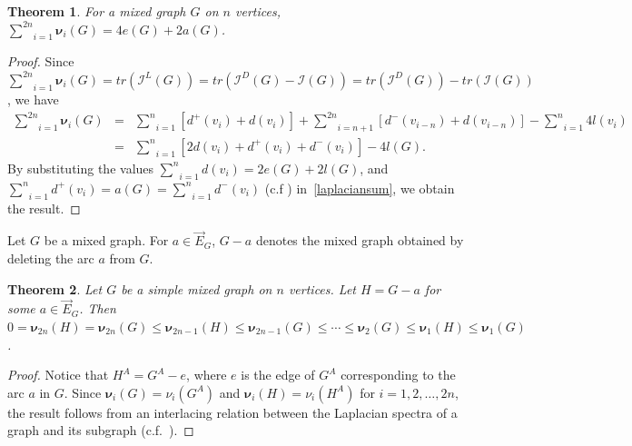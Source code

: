 \documentclass[12pt]{article}
\numberwithin{equation}{section}
\newtheorem{thm}{Theorem}[section]
\begin{document}
	\begin{thm}\label{thm-laplacian-evsum}
		For a mixed graph $G$ on $n$ vertices, $\underset{i=1}{\overset{2n}{\sum}}\bm{\nu}_i(G)=4e(G)+2a(G)$.
	\end{thm}
	\begin{proof}
		Since $\underset{i=1}{\overset{2n}{\sum}}\bm{\nu}_i(G)=tr(\mathcal{I}^L(G))=tr(\mathcal{I}^D(G)-\mathcal{I}(G))=tr(\mathcal{I}^D(G))-tr(\mathcal{I}(G))$, we have
		\begin{eqnarray}\label{laplaciansum}
			\underset{i=1}{\overset{2n}{\sum}}\bm{\nu}_i(G)
			&=&\underset{i=1}{\overset{n}{\sum}}[d^{+}(v_i)+d(v_i)]+\underset{i=n+1}{\overset{2n}{\sum}}[d^{-}(v_{i-n})+d(v_{i-n})]\nonumber-\underset{i=1}{\overset{n}{\sum}}4l(v_i)\\
			&=&\underset{i=1}{\overset{n}{\sum}}[2d(v_i)+d^{+}(v_i)+d^{-}(v_i)]-4l(G).
		\end{eqnarray} 
		 By substituting the values  $\underset{i=1}{\overset{n}{\sum}}d(v_i)=2e(G)+2l(G)$, and
		$\underset{i=1}{\overset{n}{\sum}}d^+(v_i)=a(G)=\underset{i=1}{\overset{n}{\sum}}d^-(v_i)$ (c.f \cite[Proposition~4.1]{Kalaimatrices1}) in~\eqref{laplaciansum},  we obtain the result.
	\end{proof}
	Let $G$ be a mixed graph. For $a\in \vec{E}_G$, $G-a$ denotes the mixed graph obtained by deleting the arc $a$ from $G$.
	\begin{thm}
		Let $G$ be a simple mixed graph on $n$ vertices. Let $H=G-a$ for some $a\in \vec{E}_G$. Then $0=\bm{\nu}_{2n}(H)=\bm{\nu}_{2n}(G)\leq\bm{\nu}_{2n-1}(H)\leq\bm{\nu}_{2n-1}(G)\leq\cdots\leq\bm{\nu}_{2}(G)\leq\bm{\nu}_{1}(H)\leq\bm{\nu}_{1}(G)$.
	\end{thm}
	\begin{proof}
		Notice that $H^A=G^A-e$, where $e$ is the edge of $G^A$ corresponding to the arc $a$ in $G$. Since $\bm{\nu}_i(G)=\nu_i(G^A)$ and $\bm{\nu}_i(H)=\nu_i(H^A)$ for $i=1,2,\ldots,2n$, the result follows from an interlacing relation between the Laplacian spectra of a graph and its subgraph (c.f.~\cite[Theorem~7.1.5]{cvetkovic}).
	\end{proof}
	
	
\end{document}
